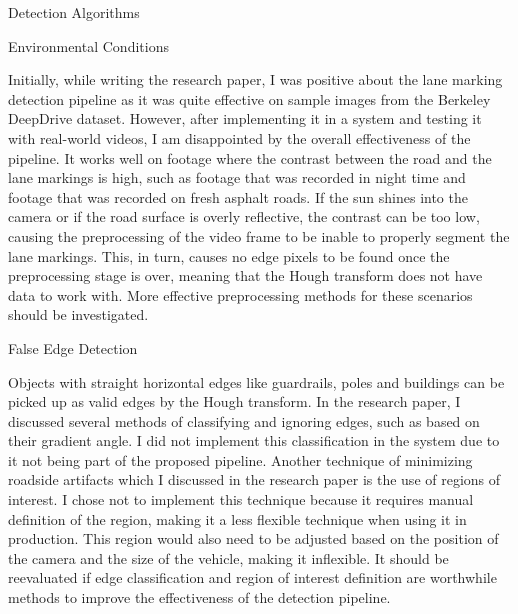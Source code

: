 \documentclass{matthijs}
\begin{document}
	\begin{hoofdstuk}{Detection Algorithms}

		\begin{paragraaf}{Environmental Conditions}

			Initially, while writing the research paper, I was positive about the lane marking detection pipeline as it was quite effective on sample images from the Berkeley DeepDrive dataset.
			However, after implementing it in a system and testing it with real-world videos, I am disappointed by the overall effectiveness of the pipeline.
			It works well on footage where the contrast between the road and the lane markings is high, such as footage that was recorded in night time and footage that was recorded on fresh asphalt roads.
			If the sun shines into the camera or if the road surface is overly reflective, the contrast can be too low, causing the preprocessing of the video frame to be inable to properly segment the lane markings.
			This, in turn, causes no edge pixels to be found once the preprocessing stage is over, meaning that the Hough transform does not have data to work with.
			More effective preprocessing methods for these scenarios should be investigated.

		\end{paragraaf}

		\begin{paragraaf}{False Edge Detection}

			Objects with straight horizontal edges like guardrails, poles and buildings can be picked up as valid edges by the Hough transform.
			In the research paper, I discussed several methods of classifying and ignoring edges, such as based on their gradient angle.
			I did not implement this classification in the system due to it not being part of the proposed pipeline.
			Another technique of minimizing roadside artifacts which I discussed in the research paper is the use of regions of interest.
			I chose not to implement this technique because it requires manual definition of the region, making it a less flexible technique when using it in production.
			This region would also need to be adjusted based on the position of the camera and the size of the vehicle, making it inflexible.
			It should be reevaluated if edge classification and region of interest definition are worthwhile methods to improve the effectiveness of the detection pipeline.

		\end{paragraaf}

	\end{hoofdstuk}
\end{document}
